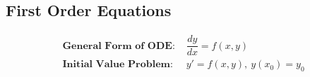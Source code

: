 \documentclass[10pt,portrait, leqno]{article}
\begin{document}
\pagestyle{empty}
 
\begin{center}

\section*{First Order Equations}
\begin{minipage}{4in}
\begin{align}
\textbf{General Form of ODE:\ }& \dfrac{dy}{dx}=f(x,y)\\
\textbf{Initial Value Problem:\ }& y'=f(x,y),\ y(x_0) = y_0
\end{align}
\end{minipage}

\end{center}
\vspace{1em}
\end{document}
